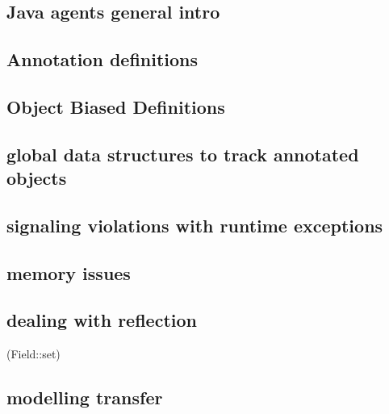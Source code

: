 \documentclass[../main.tex]{subfiles}
\begin{document}
\subsection{Java agents general intro}

\subsection{Annotation definitions}

\subsection{Object Biased Definitions}

\subsection{global data structures to track annotated objects}

\subsection{signaling violations with runtime exceptions}

\subsection{memory issues}

\subsection{dealing with reflection}
(Field::set)

\subsection{modelling transfer}
\end{document}
